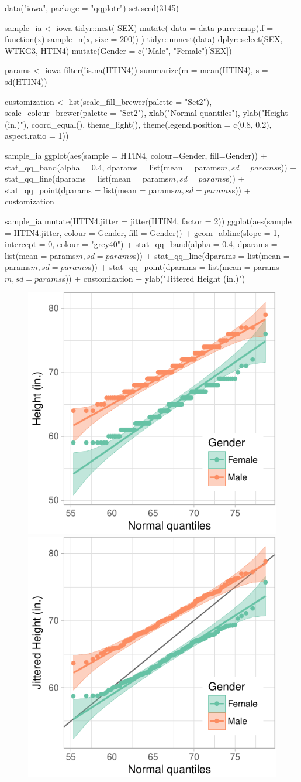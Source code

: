\begin{Schunk}
\begin{Sinput}
data("iowa", package = "qqplotr")
set.seed(3145)

sample_ia <- iowa %
  tidyr::nest(-SEX) %
  mutate(
    data = data %
    purrr::map(.f = function(x) sample_n(x, size = 200))
    ) %
  tidyr::unnest(data) %
  dplyr::select(SEX, WTKG3, HTIN4) %
  mutate(Gender = c("Male", "Female")[SEX])

params <- iowa %
  filter(!is.na(HTIN4)) %
  summarize(m = mean(HTIN4), s = sd(HTIN4))

customization <- list(scale_fill_brewer(palette = "Set2"),
                      scale_colour_brewer(palette = "Set2"),
                      xlab("Normal quantiles"),
                      ylab("Height (in.)"),
                      coord_equal(),
                      theme_light(),
                      theme(legend.position = c(0.8, 0.2), aspect.ratio = 1))

sample_ia %
  ggplot(aes(sample = HTIN4, colour=Gender, fill=Gender)) + 
  stat_qq_band(alpha = 0.4,
               dparams = list(mean = params$m, sd = params$s)) + 
  stat_qq_line(dparams = list(mean = params$m, sd = params$s)) + 
  stat_qq_point(dparams = list(mean = params$m, sd = params$s)) +
  customization

sample_ia %
  mutate(HTIN4.jitter = jitter(HTIN4, factor = 2)) %
  ggplot(aes(sample = HTIN4.jitter, colour = Gender, fill = Gender)) + 
  geom_abline(slope = 1, intercept = 0, colour = "grey40") +
  stat_qq_band(alpha = 0.4,
               dparams = list(mean = params$m, sd = params$s)) +
  stat_qq_line(dparams = list(mean = params$m, sd = params$s)) + 
  stat_qq_point(dparams = list(mean = params$m, sd = params$s)) +
  customization +
  ylab("Jittered Height (in.)") 
\end{Sinput}
\begin{figure}

{\centering \includegraphics[width=0.4\linewidth]{loy-figures/heights-1} \includegraphics[width=0.4\linewidth]{loy-figures/heights-2} 

}
\end{figure}
\end{Schunk}
